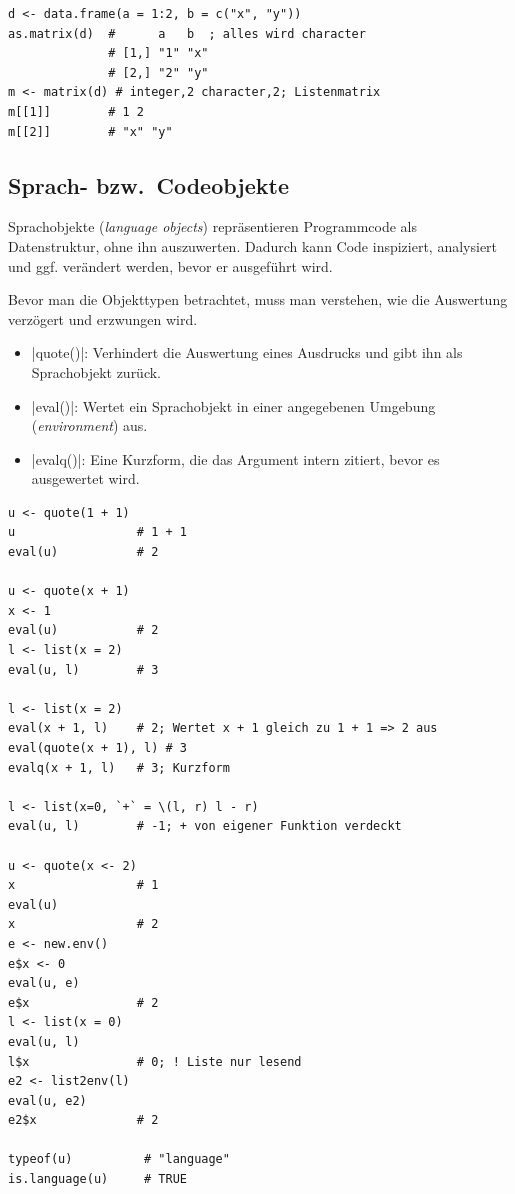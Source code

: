 \documentclass[10pt,twocolumn]{scrartcl}
\renewcommand{\lstinline}{\mycoloredinline}
\begin{document}
\begin{lstlisting}
d <- data.frame(a = 1:2, b = c("x", "y"))
as.matrix(d)  #      a   b  ; alles wird character
              # [1,] "1" "x"
              # [2,] "2" "y"
m <- matrix(d) # integer,2 character,2; Listenmatrix
m[[1]]        # 1 2
m[[2]]        # "x" "y"
\end{lstlisting}


\subsection{Sprach- bzw.\ Codeobjekte}

Sprachobjekte (\emph{language objects}) repräsentieren Programmcode als Datenstruktur, ohne ihn auszuwerten. Dadurch kann Code inspiziert, analysiert und ggf. verändert werden, bevor er ausgeführt wird.

Bevor man die Objekttypen betrachtet, muss man verstehen, wie die Auswertung verzögert und erzwungen wird.

\begin{itemize}
    \item \lstinline|quote()|: Verhindert die Auswertung eines Ausdrucks und gibt ihn als Sprachobjekt zurück.
    \item \lstinline|eval()|: Wertet ein Sprachobjekt in einer angegebenen Umgebung (\emph{environment}) aus.
    \item \lstinline|evalq()|: Eine Kurzform, die das Argument intern zitiert, bevor es ausgewertet wird.
\end{itemize}

\begin{lstlisting}
u <- quote(1 + 1)
u                 # 1 + 1
eval(u)           # 2

u <- quote(x + 1)
x <- 1
eval(u)           # 2
l <- list(x = 2)
eval(u, l)        # 3

l <- list(x = 2)
eval(x + 1, l)    # 2; Wertet x + 1 gleich zu 1 + 1 => 2 aus
eval(quote(x + 1), l) # 3
evalq(x + 1, l)   # 3; Kurzform

l <- list(x=0, `+` = \(l, r) l - r)
eval(u, l)        # -1; + von eigener Funktion verdeckt

u <- quote(x <- 2)
x                 # 1
eval(u)
x                 # 2
e <- new.env()
e$x <- 0
eval(u, e)
e$x               # 2
l <- list(x = 0)
eval(u, l)
l$x               # 0; ! Liste nur lesend
e2 <- list2env(l)
eval(u, e2)
e2$x              # 2

typeof(u)          # "language"
is.language(u)     # TRUE
\end{lstlisting}
\end{document}
